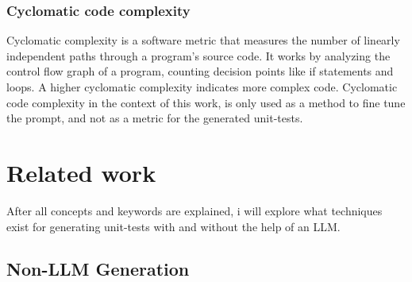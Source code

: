 \documentclass[a4paper,11pt,oneside]{memoir}
\begin{document}
\subsection{Cyclomatic code complexity}
Cyclomatic complexity is a software metric that measures the number of linearly independent paths through a program's source code. It works by analyzing the control flow graph of a program, counting decision points like if statements and loops. A higher cyclomatic complexity indicates more complex code. 
Cyclomatic code complexity in the context of this work, is only used as a method to fine tune the prompt, and not as a metric for the generated unit-tests.

\chapter{Related work}
\label{RelatedWork}
After all concepts and keywords are explained, i will explore what techniques exist for generating unit-tests with and without the help of an LLM. 

\section{Non-LLM Generation}
\end{document}
